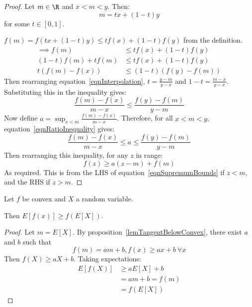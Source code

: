 \documentclass[../Main.tex]{subfiles}
\begin{document}
\begin{proof}
    Let $m \in \R$ and $x < m < y$. Then:
    \begin{equation}
        m = tx + (1-t)y
        \label{eqnInterpolation}
    \end{equation}
    for some $t \in [0, 1]$.\par
    $f(m) = f(tx + (1-t)y) \leq tf(x) + (1-t)f(y)$ from the definition.
    \begin{align*}
        \implies f(m) &\leq  tf(x) + (1-t)f(y) \\
        (1 - t) f(m) + tf(m) &\leq tf(x) + (1-t)f(y) \\
        t(f(m) - f(x)) &\leq (1-t)(f(y)-f(m))
    \end{align*}
    Then rearranging equation~\ref{eqnInterpolation}, $t = \frac{y - m}{y - x}$ and $1 - t = \frac{m - x}{y - x}$. Substituting this in the inequality gives:
    \begin{equation}
        \frac{f(m) - f(x)}{m - x} \leq \frac{f(y) - f(m)}{y-m}
        \label{eqnRatioInequality}
    \end{equation}
    Now define $a = \sup_{x < m} \frac{f(m) - f(x)}{m - x}$. Therefore, for all $x < m < y$, equation~\ref{eqnRatioInequality} gives:
    \begin{equation}
        \frac{f(m) - f(x)}{m - x} \leq a \leq \frac{f(y) - f(m)}{y - m}
        \label{eqnSupremumBounds}
    \end{equation}
    Then rearranging this inequality, for any $z$ in range:
    \begin{equation*}
        f(z) \geq a(z - m) + f(m)
    \end{equation*}
    As required. This is from the LHS of equation~\ref{eqnSupremumBounds} if $z < m$, and the RHS if $z > m$.
\end{proof}
\begin{theorem}
    Let $f$ be convex and $X$ a random variable.\par
    Then $E[f(x)] \geq f(E[X])$.
    \label{thmJensenInequality}
\end{theorem}
\begin{proof}
    Let $m = E[X]$. By proposition~\ref{lemTangentBelowConvex}, there exist $a$ and $b$ such that
    \begin{equation*}
        f(m) = am + b, f(x) \geq ax + b~\forall x
    \end{equation*}
    Then $f(X) \geq aX + b$. Taking expectations:
    \begin{align*}
        E[f(X)] &\geq aE[X] + b \\
        &= am + b = f(m) \\
        &= f(E[X])
    \end{align*}
\end{proof}
\end{document}
